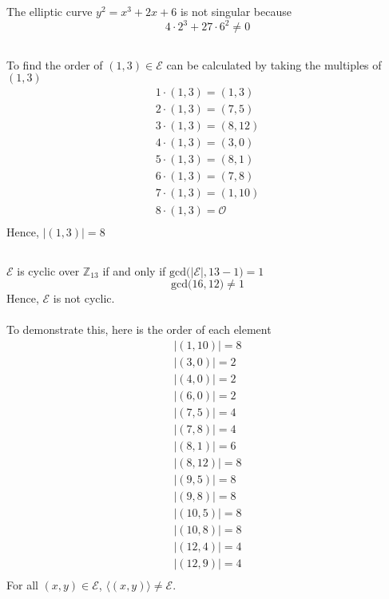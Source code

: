 \documentclass{article}
\begin{document}
\section{}
\subsection{}
The elliptic curve $y^2 = x^3 + 2x + 6$ is not singular because
\[
4\cdot 2^3 + 27 \cdot 6^2 \ne 0 
\]
\subsection{}
To find the order of $(1, 3) \in \mathcal{E}$ can be calculated by
taking the multiples of $(1, 3)$
\[
\begin{split}
1\cdot(1,3) = (1,3) \\
2\cdot(1,3) = (7,5) \\
3\cdot(1,3) = (8,12) \\
4\cdot(1,3) = (3,0) \\
5\cdot(1,3) = (8,1) \\
6\cdot(1,3) = (7,8) \\
7\cdot(1,3) = (1,10) \\
8\cdot(1,3) = \mathcal{O} \\
\end{split}
\]
Hence, $|(1, 3)| = 8$
\subsection{}
$\mathcal{E}$ is cyclic over $\mathbb{Z}_{13}$ if and only if 
$\textrm{gcd}\big(|\mathcal{E}|, 13-1\big) = 1$
\[
\textrm{gcd}\big(16, 12\big) \ne 1 
\]
Hence, $\mathcal{E}$ is not cyclic.
\\
\\
To demonstrate this, here is the order of each element
\[
\begin{split}
|(1,10)| = 8 \\
|(3,0)| = 2 \\
|(4,0)| = 2 \\
|(6,0)| = 2 \\
|(7,5)| = 4 \\
|(7,8)| = 4 \\
|(8,1)| = 6 \\
|(8,12)| = 8 \\
|(9,5)| = 8 \\
|(9,8)| = 8 \\
|(10,5)| = 8 \\
|(10,8)| = 8 \\
|(12,4)| = 4 \\
|(12,9)| = 4 \\
\end{split}
\]
For all $(x,y) \in \mathcal{E}$, $\langle (x,y)\rangle \ne \mathcal{E}$.
\end{document}
